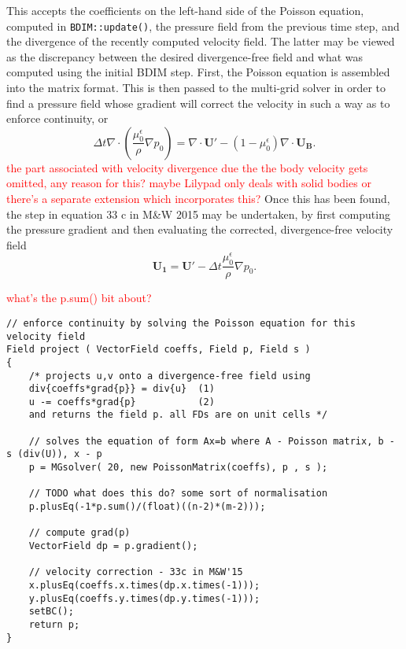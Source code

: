 \documentclass[notitlepage]{article}
\begin{document}
This accepts the coefficients on the left-hand side of the Poisson equation, computed
in \texttt{BDIM::update()}, the pressure field from the previous time step, and the
divergence of the recently computed velocity field. The latter may be viewed as the
discrepancy between the desired divergence-free field and what was computed using the
initial BDIM step.
First, the Poisson equation is assembled into the matrix format. This is then passed to
the multi-grid solver in order to find a pressure field whose gradient will correct
the velocity in such a way as to enforce continuity, or
%
\begin{equation}\label{eq:PoissonEquation}
\Delta t \nabla \cdot \left( \frac{\mu_0^\epsilon}{\rho} \nabla p_0 \right) = 
	\nabla \cdot \mathbf{U'} - (1-\mu_0^\epsilon ) \nabla \cdot \mathbf{U_B} .
\end{equation}
%
\textcolor{red}{the part associated with velocity divergence due the the body
velocity gets omitted, any reason for this? maybe Lilypad only deals with solid
bodies or there's a separate extension which incorporates this?}
Once this has been found, the step in equation 33 c in M\&W 2015 may be undertaken,
by first computing the pressure gradient and then evaluating the corrected, divergence-free
velocity field
%
\begin{equation}\label{eq:PoissonCorrection}
\mathbf{U_1} = \mathbf{U'} - \Delta t \frac{\mu_0^\epsilon}{\rho} \nabla p_0 .
\end{equation}

\textcolor{red}{what's the p.sum() bit about?}

\begin{lstlisting}[style=myCpp]
// enforce continuity by solving the Poisson equation for this velocity field
Field project ( VectorField coeffs, Field p, Field s )
{
	/* projects u,v onto a divergence-free field using
	div{coeffs*grad{p}} = div{u}  (1)
	u -= coeffs*grad{p}           (2)
	and returns the field p. all FDs are on unit cells */
	
	// solves the equation of form Ax=b where A - Poisson matrix, b - s (div(U)), x - p
	p = MGsolver( 20, new PoissonMatrix(coeffs), p , s );
	
	// TODO what does this do? some sort of normalisation
	p.plusEq(-1*p.sum()/(float)((n-2)*(m-2)));
	
	// compute grad(p)
	VectorField dp = p.gradient();
	
	// velocity correction - 33c in M&W'15
	x.plusEq(coeffs.x.times(dp.x.times(-1)));
	y.plusEq(coeffs.y.times(dp.y.times(-1)));
	setBC();
	return p;
}
\end{lstlisting}
\end{document}

